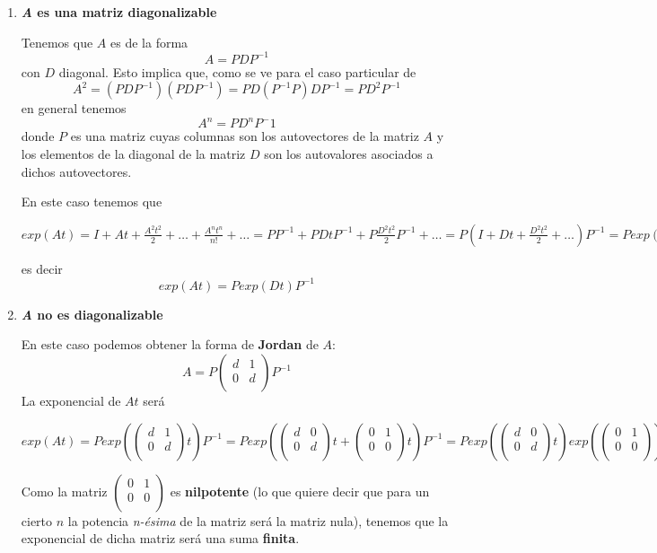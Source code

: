 \documentclass{mathnotes}
\begin{document}
\begin{enumerate}
\item \textbf{\textit{A} es una matriz diagonalizable}

Tenemos que $A$ es de la forma $$A = PDP^{-1}$$ con $D$ diagonal. Esto implica que, como se ve para el caso particular de $$A^2 = (PDP^{-1})(PDP^{-1}) = PD(P^{-1}P)DP^{-1} = PD^2P^{-1}$$ en general tenemos $$A^n = PD^nP^-1$$ donde $P$ es una matriz cuyas columnas son los autovectores de la matriz $A$ y los elementos de la diagonal de la matriz $D$ son los autovalores asociados a dichos autovectores.

En este caso tenemos que
\begin{center}
$exp(At) = I + At + \frac{A^2t^2}{2} + \hdots +\frac{A^nt^n}{n!} + \hdots =PP^{-1} + PDtP^{-1} + P\frac{D^2t^2}{2}P^{-1} + \hdots = P(I+Dt+\frac{D^2t^2}{2}+\hdots)P^{-1} = Pexp(Dt)P^{-1}$
\end{center}
es decir
$$exp(At) = Pexp(Dt)P^{-1}$$

\item \textbf{\textit{A} no es diagonalizable}

En este caso podemos obtener la forma de \textbf{Jordan} de $A$:
$$A = P\begin{pmatrix}
d & 1\\0 & d\\
\end{pmatrix}P^{-1}$$
La exponencial de $At$ será
\begin{center}
$exp(At) = Pexp({\begin{pmatrix}
d & 1\\0 & d\\
\end{pmatrix}t})P^{-1} = Pexp({\begin{pmatrix}
d & 0\\0 & d\\
\end{pmatrix}t + \begin{pmatrix}
0 & 1\\ 0 & 0\\
\end{pmatrix}}t)P^{-1} = Pexp(\begin{pmatrix}
d & 0\\ 0 & d\\
\end{pmatrix}t)exp(\begin{pmatrix}
0 & 1\\ 0 & 0\\
\end{pmatrix})P^{-1}$
\end{center}
Como la matriz $\begin{pmatrix}
0 & 1\\ 0 & 0\\
\end{pmatrix}$ es \textbf{nilpotente} (lo que quiere decir que para un cierto $n$ la potencia \textit{n-ésima} de la matriz será la matriz nula), tenemos que la exponencial de dicha matriz será una suma \textbf{finita}.
\end{enumerate}
\end{document}
